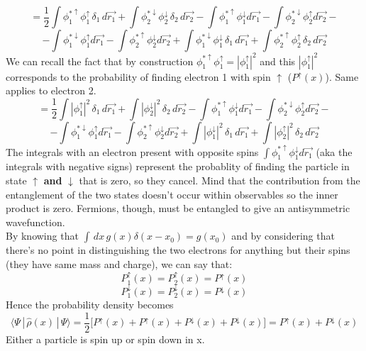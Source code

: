 \[
=\frac{1}{2}\int \phi_1^{*\uparrow}\phi_1^\uparrow \,\delta_1\, d\vec{r_1}
+\int \phi_2^{*\downarrow}\phi_2^\downarrow\, \delta_2\, d\vec{r_2}
-\int \phi_1^{*\uparrow}\phi_1^\downarrow d\vec{r_1}
-\int \phi_2^{*\downarrow}\phi_2^\uparrow d\vec{r_2}-\]
\[
-\int \phi_1^{*\downarrow}\phi_1^\uparrow d\vec{r_1}
-\int \phi_2^{*\uparrow}\phi_2^\downarrow d\vec{r_2}
+\int \phi_1^{*\downarrow}\phi_1^\downarrow\, \delta_1\, d\vec{r_1}
+\int \phi_2^{*\uparrow}\phi_2^\uparrow\, \delta_2\, d\vec{r_2}
\]
We can recall the fact that by construction $\phi_1^{*\uparrow}\phi_1^\uparrow=|\phi_1^\uparrow|^2$  and this $|\phi_1^\uparrow|^2$ corresponds to the probability of finding electron 1 with spin $\uparrow$ ($P^\uparrow(x)$). Same applies to electron 2.\\
\[
=\frac{1}{2}\int |\phi_1^\uparrow|^2 \,\delta_1\, d\vec{r_1}
+\int |\phi_2^\downarrow|^2\, \delta_2\, d\vec{r_2}
-\int \phi_1^{*\uparrow}\phi_1^\downarrow d\vec{r_1}
-\int \phi_2^{*\downarrow}\phi_2^\uparrow d\vec{r_2}-\]
\[
-\int \phi_1^{*\downarrow}\phi_1^\uparrow d\vec{r_1}
-\int \phi_2^{*\uparrow}\phi_2^\downarrow d\vec{r_2}
+\int |\phi_1^\downarrow|^2\, \delta_1\, d\vec{r_1}
+\int |\phi_2^\uparrow|^2\, \delta_2\, d\vec{r_2}
\]
The integrals with an electron present with opposite spins $\int \phi_1^{*\uparrow}\phi_1^\downarrow d\vec{r_1}$ (aka the integrals with negative signs) represent the probablity of finding the particle in state $\uparrow$ \textbf{and} $\downarrow$ that is zero, so they cancel. Mind that the contribution from the entanglement of the two states doesn't occur within observables so the inner product is zero. Fermions, though, must be entangled to give an antisymmetric wavefunction.\\
By knowing that $\int\,dx\, g(x)\delta(x-x_0)=g(x_0)$ and by considering that there's no point in distinguishing the two electrons for anything but their spins (they have same mass and charge), we can say that:
\[P_1^\uparrow(x)=P_2^\uparrow(x)=P^\uparrow(x)\]
\[P_1^\downarrow(x)=P_2^\downarrow(x)=P^\downarrow(x)\]
Hence the probability density becomes
\[
\langle\Psi\,|\,\hat{\rho}(x)\,|\,\Psi \rangle =\frac{1}{2}\bigg[P^\uparrow(x)+P^\uparrow(x)+P^\downarrow(x)+P^\downarrow(x)\bigg]=P^\uparrow(x)+P^\downarrow(x)
\]
Either a particle is spin up or spin down in x.
